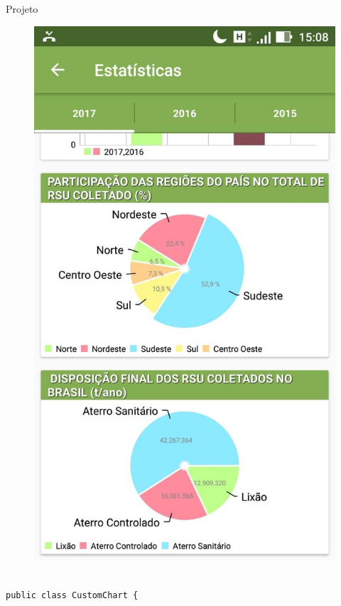 \documentclass[
	12pt,				%
	openright,			%
	twoside,			%
	a4paper,			%
	english,			%
	french,				%
	spanish,			%
	brazil				%
	]{abntex2}
\begin{document}
\begin{chapter}{Projeto}
\begin{figure}[htb]
\begin{minipage}{0.45\textwidth}
    \includegraphics[scale=0.35]{media/tela_stats_2.jpg}
     \label{fig:tela_stats_2}
  \end{minipage}
\end{figure}

\begin{lstlisting}[numbers=none,basicstyle=\small,
caption={CustomChart.java},
title={CustomChart.java},
label={CustomChart.java}]

public class CustomChart {



\end{lstlisting}
\end{chapter}
\end{document}
